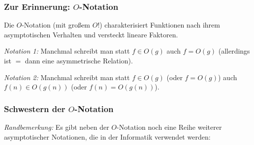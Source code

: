 \documentclass[onlymath]{beamer}
\begin{document}
\begin{frame}\frametitle{Zur Erinnerung: $O$-Notation}

Die $O$-Notation (mit großem $O$!) charakterisiert Funktionen nach ihrem asymptotischen Verhalten und
versteckt lineare Faktoren.

\pause

\emph{Notation 1:} Manchmal schreibt man statt $f\in O(g)$ auch $f=O(g)$ (allerdings ist $=$ dann eine
asymmetrische Relation).\medskip

\emph{Notation 2:} Manchmal schreibt man statt $f\in O(g)$ (oder $f=O(g)$) auch $f(n)\in O(g(n))$ (oder $f(n)=O(g(n))$).


\end{frame}

\begin{frame}\frametitle{Schwestern der $O$-Notation}

\emph{Randbemerkung:} Es gibt neben der $O$-Notation noch eine Reihe weiterer
asymptotischer Notationen, die in der Informatik verwendet werden:\bigskip


\end{frame}
\end{document}
